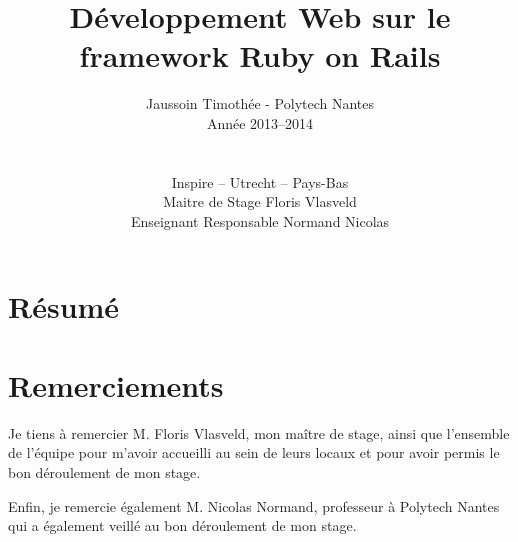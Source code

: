 \documentclass[12pt,a4paper]{book}
\author{Jaussoin Timothée - Polytech Nantes\\ Année 2013--2014 \\
\\ \\ Inspire -- Utrecht -- Pays-Bas\\  Maitre de Stage Floris Vlasveld\\ Enseignant Responsable Normand Nicolas}
\title{Développement Web sur le framework Ruby on Rails}
\begin{document}
\begin{titlepage}
	\maketitle
\end{titlepage}

\tableofcontents

\newpage
\clearpage
{}
    \section*{Résumé}
	



\newpage
\clearpage
{}
\section*{Remerciements}

Je tiens à remercier M. Floris Vlasveld, mon maître de stage, ainsi que l'ensemble de l'équipe pour m'avoir accueilli au sein de leurs locaux et pour avoir permis le bon déroulement de mon stage.



Enfin, je remercie également M. Nicolas Normand, professeur à Polytech Nantes qui a également veillé au bon déroulement de mon stage.

\end{document}
